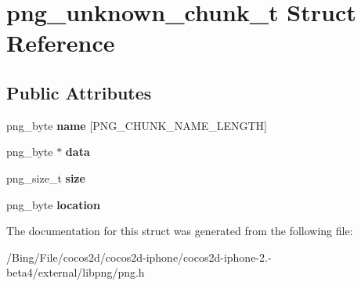 \hypertarget{structpng__unknown__chunk__t}{\section{png\-\_\-unknown\-\_\-chunk\-\_\-t Struct Reference}
\label{structpng__unknown__chunk__t}
}
\subsection*{Public Attributes}
\begin{DoxyCompactItemize}
\item 
\hypertarget{structpng__unknown__chunk__t_a53686ea85d0701924ad5ac69e43fb5b9}{png\-\_\-byte {\bfseries name} \mbox{[}P\-N\-G\-\_\-\-C\-H\-U\-N\-K\-\_\-\-N\-A\-M\-E\-\_\-\-L\-E\-N\-G\-T\-H\mbox{]}}\label{structpng__unknown__chunk__t_a53686ea85d0701924ad5ac69e43fb5b9}

\item 
\hypertarget{structpng__unknown__chunk__t_a4f37f6acbe4e2c287078bcdf03d8ee92}{png\-\_\-byte $\ast$ {\bfseries data}}\label{structpng__unknown__chunk__t_a4f37f6acbe4e2c287078bcdf03d8ee92}

\item 
\hypertarget{structpng__unknown__chunk__t_a0a691245e0c04f01ecf767f215b6a652}{png\-\_\-size\-\_\-t {\bfseries size}}\label{structpng__unknown__chunk__t_a0a691245e0c04f01ecf767f215b6a652}

\item 
\hypertarget{structpng__unknown__chunk__t_af56bfc32223b97fbcb6bd29ba7a1cc29}{png\-\_\-byte {\bfseries location}}\label{structpng__unknown__chunk__t_af56bfc32223b97fbcb6bd29ba7a1cc29}

\end{DoxyCompactItemize}


The documentation for this struct was generated from the following file\-:\begin{DoxyCompactItemize}
\item 
/\-Bing/\-File/cocos2d/cocos2d-\/iphone/cocos2d-\/iphone-\/2.-\/beta4/external/libpng/png.\-h\end{DoxyCompactItemize}
